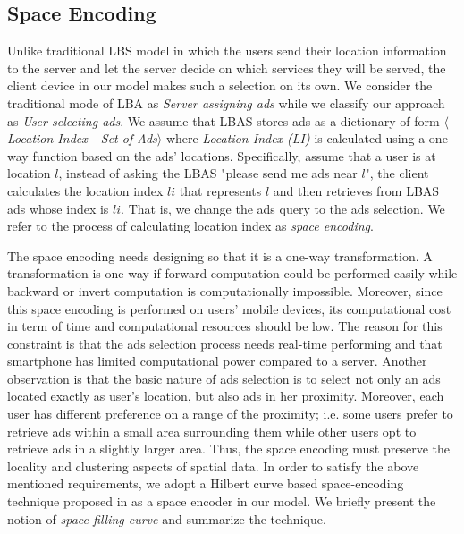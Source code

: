 \subsection{Space Encoding} 
\label{subsec:space_encoding}
Unlike traditional LBS model in which the users send their location information to the server and let the server decide on which services they will be served, the client device in our model makes such a selection on its own. We consider the traditional mode of LBA as \textit{Server assigning ads} while we classify our approach as \textit{User selecting ads}. We assume that LBAS stores ads as a dictionary of form $\langle$\textit{Location Index - Set of Ads}$\rangle$ where \textit{Location Index (LI)}  is calculated using a one-way function based on the ads' locations. Specifically, assume that a user is at location $l$, instead of asking the LBAS "please send me ads near $l$", the client calculates the location index $li$ that represents $l$ and then retrieves from LBAS ads whose index is $li$. That is, we change the ads query to the ads selection. We refer to the process of calculating location index as \textit{space encoding}. 

The space encoding needs designing so that it is a one-way transformation. A transformation is one-way if forward computation could be performed easily while backward or invert computation is computationally impossible. Moreover, since this space encoding is performed on users' mobile devices, its computational cost in term of time and computational resources should be low. The reason for this constraint is that the ads selection process needs real-time performing and that smartphone has limited computational power compared to a server. Another observation is that the basic nature of ads selection is to select not only an ads located exactly as user's location, but also ads in her proximity. Moreover, each user has different preference on a range of the proximity; i.e. some users prefer to retrieve ads within a small area surrounding them while other users opt to retrieve ads in a slightly larger area. Thus, the space encoding must preserve the locality and clustering aspects of spatial data. In order to satisfy the above mentioned requirements, we adopt a Hilbert curve based space-encoding technique proposed in \cite{Space_Transformation} as a space encoder in our model. We briefly present the notion of \textit{space filling curve} and summarize the technique.

